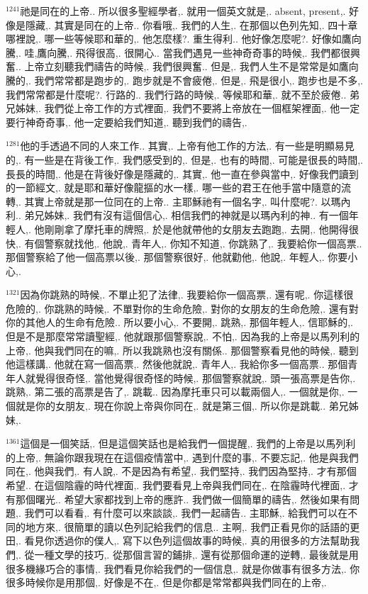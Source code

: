 \documentclass{book}
\begin{document}
$^{1241}$祂是同在的上帝..
所以很多聖經學者,.
就用一個英文就是,.
absent, present,.
好像是隱藏,.
其實是同在的上帝..
你看哦,.
我們的人生,.
在那個以色列先知,.
四十章哪裡說,.
哪一些等候耶和華的,.
他怎麼樣?.
重生得利..
他好像怎麼呢?.
好像如鷹向騰,.
哇,鷹向騰,.
飛得很高,.
很開心..
當我們遇見一些神奇奇事的時候,.
我們都很興奮..
上帝立刻聽我們禱告的時候,.
我們很興奮..
但是,.
我們人生不是常常是如鷹向騰的,.
我們常常都是跑步的,.
跑步就是不會疲倦,.
但是,.
飛是很小,.
跑步也是不多,.
我們常常都是什麼呢?.
行路的..
我們行路的時候,.
等候耶和華,.
就不至於疲倦..
弟兄姊妹,.
我們從上帝工作的方式裡面,.
我們不要將上帝放在一個框架裡面,.
他一定要行神奇奇事,.
他一定要給我們知道,.
聽到我們的禱告,.

$^{1281}$他的手透過不同的人來工作..
其實,.
上帝有他工作的方法,.
有一些是明顯易見的,.
有一些是在背後工作,.
我們感受到的,.
但是,.
也有的時間,.
可能是很長的時間,.
長長的時間,.
他是在背後好像是隱藏的,.
其實,.
他一直在參與當中,.
好像我們讀到的一節經文,.
就是耶和華好像龍摳的水一樣,.
哪一些的君王在他手當中隨意的流轉,.
其實上帝就是那一位同在的上帝..
主耶穌祂有一個名字,.
叫什麼呢?.
以瑪內利..
弟兄姊妹,.
我們有沒有這個信心,.
相信我們的神就是以瑪內利的神..
有一個年輕人,.
他剛剛拿了摩托車的牌照,.
於是他就帶他的女朋友去跑跑,.
去開,.
他開得很快,.
有個警察就找他,.
他說,.
青年人,.
你知不知道,.
你跳熟了,.
我要給你一個高票..
那個警察給了他一個高票以後,.
那個警察很好,.
他就勸他,.
他說,.
年輕人,.
你要小心,.

$^{1321}$因為你跳熟的時候,.
不單止犯了法律,.
我要給你一個高票,.
還有呢,.
你這樣很危險的,.
你跳熟的時候,.
不單對你的生命危險,.
對你的女朋友的生命危險,.
還有對你的其他人的生命有危險..
所以要小心,.
不要開,.
跳熟,.
那個年輕人,.
信耶穌的,.
但是不是那麼常常讀聖經,.
他就跟那個警察說,.
不怕,.
因為我的上帝是以馬列利的上帝,.
他與我們同在的嘛,.
所以我跳熟也沒有關係..
那個警察看見他的時候,.
聽到他這樣講,.
他就在寫一個高票,.
然後他就說,.
青年人,.
我給你多一個高票..
那個青年人就覺得很奇怪,.
當他覺得很奇怪的時候,.
那個警察就說,.
頭一張高票是告你,.
跳熟,.
第二張的高票是告了,.
跳載..
因為摩托車只可以載兩個人,.
一個就是你,.
一個就是你的女朋友,.
現在你說上帝與你同在,.
就是第三個,.
所以你是跳載..
弟兄姊妹,.

$^{1361}$這個是一個笑話,.
但是這個笑話也是給我們一個提醒,.
我們的上帝是以馬列利的上帝,.
無論你跟我現在在這個疫情當中,.
遇到什麼的事,.
不要忘記,.
他是與我們同在,.
他與我們,.
有人說,.
不是因為有希望,.
我們堅持,.
我們因為堅持,.
才有那個希望..
在這個陰霾的時代裡面,.
我們要看見上帝與我們同在,.
在陰霾時代裡面,.
才有那個曙光..
希望大家都找到上帝的應許..
我們做一個簡單的禱告,.
然後如果有問題,.
我們可以看看,.
有什麼可以來談談,.
我們一起禱告..
主耶穌,.
給我們可以在不同的地方來,.
很簡單的讀以色列記給我們的信息..
主啊,.
我們正看見你的話語的更田,.
看見你透過你的僕人,.
寫下以色列這個故事的時候,.
真的用很多的方法幫助我們,.
從一種文學的技巧,.
從那個言習的鋪排,.
還有從那個命運的逆轉,.
最後就是用很多機緣巧合的事情,.
我們看見你給我們的一個信息,.
就是你做事有很多方法,.
你很多時候你是用那個,.
好像是不在,.
但是你都是常常都與我們同在的上帝,.
\end{document}
